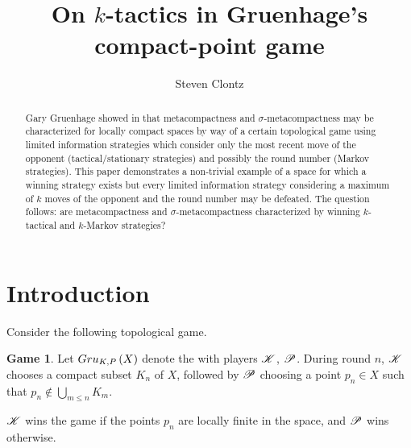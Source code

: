 \documentclass{amsart}
\theoremstyle{definition}
\newtheorem{game}[theorem]{Game}
\begin{document}
\title{On $k$-tactics in Gruenhage's compact-point game}




\author{Steven Clontz}
\address{Department of Mathematics, Auburn University,
Auburn, AL 36830}




\begin{abstract}
Gary Gruenhage showed in \cite{MR858337} that metacompactness and
$\sigma$-metacompactness may be characterized for locally compact spaces
by way of a certain topological game using limited information strategies
which consider only the most recent move of the opponent (tactical/stationary
strategies) and possibly the round number (Markov strategies). This paper
demonstrates a non-trivial example of a space for which a winning strategy
exists but every limited information strategy considering a maximum of $k$
moves of the opponent and the round number may be defeated. The question
follows: are metacompactness and $\sigma$-metacompactness characterized by
winning $k$-tactical and $k$-Markov strategies?
\end{abstract}


\maketitle

\section{Introduction}

Consider the following topological game.

\begin{game}
  Let $Gru_{K,P}\left({X}\right)$ denote the 
  with players $\mathscr{K}$, $\mathscr{P}$. During round $n$, $\mathscr{K}$ chooses
  a compact subset $K_n$ of $X$, followed by $\mathscr{P}$ choosing a point
  $p_n\in X$ such that $p_n\not\in \bigcup_{m\leq n}K_m$.

  $\mathscr{K}$ wins the game if the points $p_n$ are locally
  finite in the space, and $\mathscr{P}$ wins otherwise.
\end{game}
\end{document}
